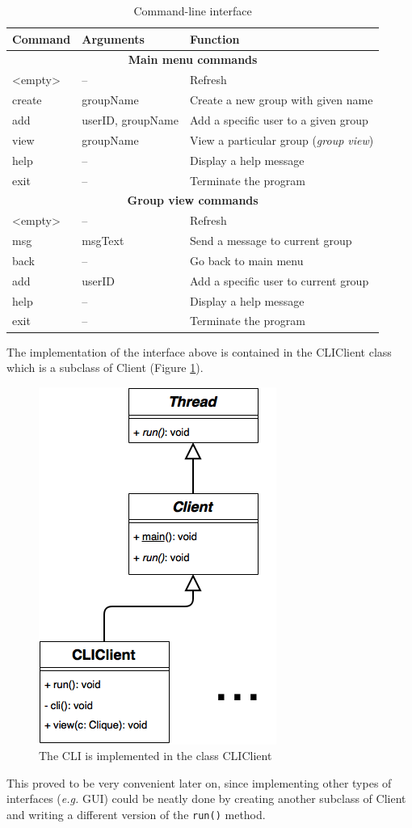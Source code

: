 \documentclass[a4paper, 12pt]{report}
\begin{document}
\begin{table}[H]
\centering
\begin{tabular*}{0.9\textwidth}{l | l | l}
    Command & Arguments & Function \\
    \hline
    \multicolumn{3}{c}{\textbf{Main menu commands}} \\
    \hline
    <empty> & -- & Refresh \\
    create & groupName & Create a new group with given name \\
    add & userID, groupName & Add a specific user to a given group \\
    view & groupName & View a particular group (\emph{group view}) \\
    help & -- & Display a help message \\
    exit & -- & Terminate the program \\
    \hline
    \multicolumn{3}{c}{\textbf{Group view commands}} \\
    \hline 
    <empty> & -- & Refresh \\
    msg & msgText & Send a message to current group \\
    back & -- & Go back to main menu \\
    add & userID & Add a specific user to current group \\
    help & -- & Display a help message \\
    exit & -- & Terminate the program \\ 
\end{tabular*}
\caption{\label{tab:CLI} Command-line interface}
\end{table}
The implementation of the interface above is contained in the CLIClient class which is a subclass of Client (Figure \ref{fig:CLIClient_uml}).
\begin{figure}[H]
\centering
\includegraphics[width = 0.31 \linewidth]{pics/CLIClient_uml.png}
\caption{\label{fig:CLIClient_uml} The CLI is implemented in the class CLIClient}
\end{figure}
This proved to be very convenient later on, since implementing other types of interfaces (\textit{e.g.} GUI) could be neatly done by creating another subclass of Client and writing a different version of the \texttt{run()} method.
\end{document}
